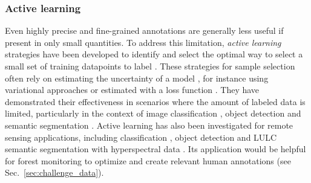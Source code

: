 \documentclass{CUP-JNL-DTM}%
\theoremstyle{definition}
\numberwithin{equation}{section}
\begin{document}
\subsubsection{Active learning}
\label{sec:ml_active}
Even highly precise and fine-grained annotations are generally less useful if present in only small quantities. 
To address this limitation, \emph{active learning} strategies have been developed to identify and select the optimal way to select a small set of training datapoints to label \cite{cohn_active_1996}.
%
These strategies for sample selection often rely on estimating the uncertainty of a model \cite{gal_deep_2017}, for instance using variational approaches \cite{sinha_variational_2019} or estimated with a loss function \cite{yoo_learning_2019}.
They have demonstrated their effectiveness in scenarios where the amount of labeled data is limited, particularly in the context of image classification \cite{gal_deep_2017, sinha_variational_2019, yoo_learning_2019}, object detection \cite{roy_deep_2019} and semantic segmentation \cite{siddiqui_viewal_2020}.
%
Active learning has also been investigated for remote sensing applications, including classification \cite{tuia_survey_2011}, object detection \cite{qu_deep_2020} and LULC semantic segmentation with hyperspectral data \cite{li_semisupervised_2010, li_hyperspectral_2011, zhang_active_2016}.
%
Its application would be helpful for forest monitoring to optimize and create relevant human annotations (see Sec.~\ref{sec:challenge_data}).
\end{document}
